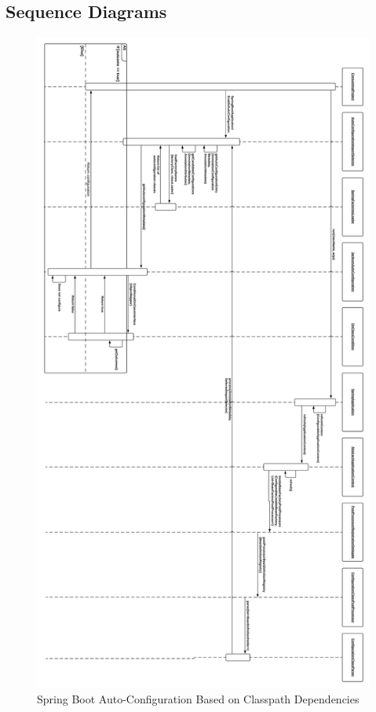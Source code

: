 \subsection{Sequence Diagrams}
\begin{figure}[H]
    \centering
    \includegraphics[width=\textwidth, height=.85\textheight, keepaspectratio]{content/architectural-views-top-level/auto-configuration.png}
    \caption{Spring Boot Auto-Configuration Based on Classpath Dependencies}
    \label{sequence-diagram-auto-configuration}
\end{figure}

